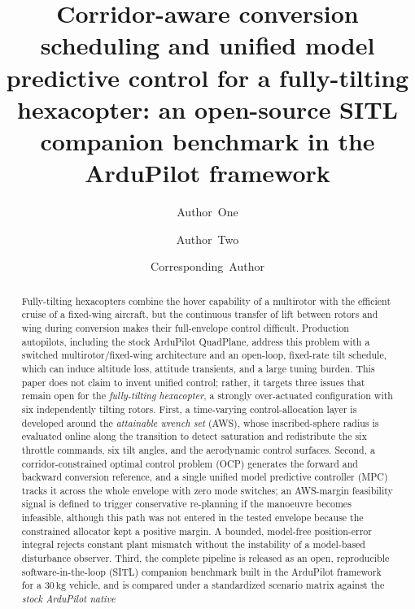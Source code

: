 \documentclass[preprint,3p,11pt]{elsarticle}
\newcommand{\SI}[2]{\ensuremath{#1\,#2}}
\newcommand{\kilogram}{\mathrm{kg}}
\begin{document}
\begin{frontmatter}

\title{Corridor-aware conversion scheduling and unified model predictive control for a fully-tilting hexacopter: an open-source SITL companion benchmark in the ArduPilot framework}

\author[a]{Author~One}
\author[a]{Author~Two}
\author[a,b]{Corresponding~Author}

\begin{abstract}
Fully-tilting hexacopters combine the hover capability of a multirotor with
the efficient cruise of a fixed-wing aircraft, but the continuous transfer of
lift between rotors and wing during conversion makes their full-envelope
control difficult. Production autopilots, including the stock ArduPilot
QuadPlane, address this problem with a switched multirotor/fixed-wing
architecture and an open-loop, fixed-rate tilt schedule, which can induce
altitude loss, attitude transients, and a large tuning burden. This paper does
not claim to invent unified control; rather, it targets three issues that
remain open for the \emph{fully-tilting hexacopter}, a strongly over-actuated
configuration with six independently tilting rotors. First, a time-varying
control-allocation layer is developed around the \emph{attainable wrench set}
(AWS), whose inscribed-sphere radius is evaluated online along the
transition to detect saturation and redistribute the six throttle commands,
six tilt angles, and the aerodynamic control surfaces. Second, a
corridor-constrained optimal control problem (OCP) generates the
forward and backward conversion reference, and a single unified model
predictive controller (MPC) tracks it across the whole envelope with zero mode
switches; an AWS-margin feasibility signal is defined to trigger conservative
re-planning if the manoeuvre becomes infeasible, although this path was not
entered in the tested envelope because the constrained allocator kept a
positive margin. A bounded, model-free position-error
integral rejects constant plant mismatch without the instability of a
model-based disturbance observer. Third, the complete pipeline is released
as an open, reproducible software-in-the-loop (SITL) companion benchmark built
in the ArduPilot framework for a \SI{30}{\kilogram} vehicle, and is compared
under a standardized scenario matrix against the \emph{stock ArduPilot native
}
\end{abstract}
\end{frontmatter}
\end{document}
